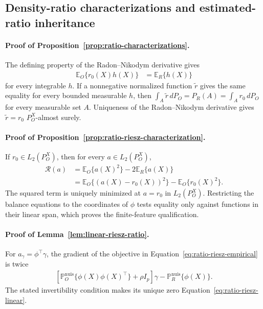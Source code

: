 \subsection{Density-ratio characterizations and estimated-ratio inheritance}
\label{app:estimated-ratio-inheritance}

\paragraph{Proof of Proposition~\ref{prop:ratio-characterizations}.}
The defining property of the Radon--Nikodym derivative gives
\begin{align*}
\mathbb E_O\{r_0(X)h(X)\}
&=
\mathbb E_R\{h(X)\}
\end{align*}
for every integrable $h$. If a nonnegative normalized function
$\widetilde r$ gives
the same equality for every bounded measurable $h$, then
$\int_A \widetilde r\,dP_O=P_R(A)=\int_A r_0\,dP_O$ for every measurable
set $A$. Uniqueness of the Radon--Nikodym derivative gives
$\widetilde r=r_0$
$P_O^X$-almost surely.

\paragraph{Proof of Proposition~\ref{prop:ratio-riesz-characterization}.}
If $r_0\in L_2(P_O^X)$, then for every $a\in L_2(P_O^X)$,
\begin{align*}
\mathcal R(a)
&=
\mathbb E_O\{a(X)^2\}-2\mathbb E_R\{a(X)\}
\\
&=
\mathbb E_O\{(a(X)-r_0(X))^2\}
-\mathbb E_O\{r_0(X)^2\}.
\end{align*}
The squared term is uniquely minimized at $a=r_0$ in
$L_2(P_O^X)$. Restricting the balance equations to the coordinates of
$\phi$ tests equality only against functions in their linear span, which
proves the finite-feature qualification.

\paragraph{Proof of Lemma~\ref{lem:linear-riesz-ratio}.}
For $a_\gamma=\phi^\top\gamma$, the gradient of the objective in
Equation~\eqref{eq:ratio-riesz-empirical} is twice
\begin{align*}
\left[
\mathbb P_O^{\mathrm{nuis}}\{\phi(X)\phi(X)^\top\}+\rho I_p
\right]\gamma
-\mathbb P_R^{\mathrm{nuis}}\{\phi(X)\}.
\end{align*}
The stated invertibility condition makes its unique zero
Equation~\eqref{eq:ratio-riesz-linear}.

